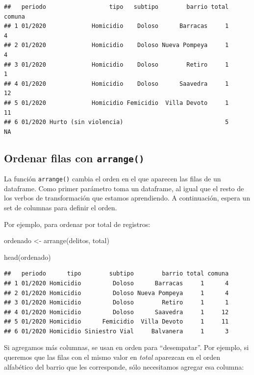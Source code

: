 \documentclass[
]{book}
\newenvironment{Shaded}{\begin{snugshade}}{\end{snugshade}}
\newcommand{\FunctionTok}[1]{\textcolor[rgb]{0.00,0.00,0.00}{#1}}
\newcommand{\NormalTok}[1]{#1}
\newcommand{\OtherTok}[1]{\textcolor[rgb]{0.56,0.35,0.01}{#1}}
\begin{document}
\begin{verbatim}
##   periodo                  tipo   subtipo        barrio total comuna
## 1 01/2020             Homicidio    Doloso      Barracas     1      4
## 2 01/2020             Homicidio    Doloso Nueva Pompeya     1      4
## 3 01/2020             Homicidio    Doloso        Retiro     1      1
## 4 01/2020             Homicidio    Doloso      Saavedra     1     12
## 5 01/2020             Homicidio Femicidio  Villa Devoto     1     11
## 6 01/2020 Hurto (sin violencia)                             5     NA
\end{verbatim}

\hypertarget{ordenar-filas-con-arrange}{%
\subsection{\texorpdfstring{Ordenar filas con \texttt{arrange()}}{Ordenar filas con arrange()}}\label{ordenar-filas-con-arrange}}

La función \texttt{arrange()} cambia el orden en el que aparecen las filas de un dataframe. Como primer parámetro toma un dataframe, al igual que el resto de los verbos de transformación que estamos aprendiendo. A continuación, espera un set de columnas para definir el orden.

Por ejemplo, para ordenar por total de registros:

\begin{Shaded}
\begin{Highlighting}[]
\NormalTok{ordenado }\OtherTok{\textless{}{-}} \FunctionTok{arrange}\NormalTok{(delitos, total)}

\FunctionTok{head}\NormalTok{(ordenado)}
\end{Highlighting}
\end{Shaded}

\begin{verbatim}
##   periodo      tipo        subtipo        barrio total comuna
## 1 01/2020 Homicidio         Doloso      Barracas     1      4
## 2 01/2020 Homicidio         Doloso Nueva Pompeya     1      4
## 3 01/2020 Homicidio         Doloso        Retiro     1      1
## 4 01/2020 Homicidio         Doloso      Saavedra     1     12
## 5 01/2020 Homicidio      Femicidio  Villa Devoto     1     11
## 6 01/2020 Homicidio Siniestro Vial     Balvanera     1      3
\end{verbatim}

Si agregamos más columnas, se usan en orden para ``desempatar''. Por ejemplo, si queremos que las filas con el mismo valor en \emph{total} aparezcan en el orden alfabético del barrio que les corresponde, sólo necesitamos agregar esa columna:
\end{document}
